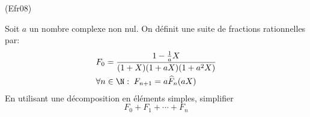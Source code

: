 \begin{tiny}(Efr08)\end{tiny} Soit $a$ un nombre complexe non nul. On définit une suite de fractions rationnelles par:
\begin{align*}
 &F_0 = \frac{1-\frac{1}{a}X}{(1+X)(1+aX)(1+a^2X)}\\
 &\forall n\in \N :\; F_{n+1} = a\widehat{F}_n(aX)
\end{align*}
En utilisant une décomposition en éléments simples, simplifier
\begin{displaymath}
 F_0+F_1+\cdots + F_n
\end{displaymath}
